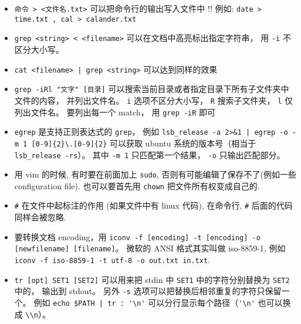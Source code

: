 \begin{itemize}
\item \verb`命令 > <文件名.txt>` 可以把命令行的输出写入文件中 !! 例如: \verb`date > time.txt , cal > calander.txt`
\item \verb`grep <string> < <filename>` 可以在文档中高亮标出指定字符串， 用 \verb|-i| 不区分大小写。
\item \verb`cat <filename> | grep <string>` 可以达到同样的效果
\item \verb`grep -iRl "文字" [目录]` 可以搜索当前目录或者指定目录下所有子文件夹中文件的内容， 并列出文件名。 \verb`i` 选项不区分大小写， \verb`R` 搜索子文件夹， \verb`l` 仅列出文件名。 要列出每一个 match， 用 \verb`grep -iR` 即可
\item \verb|egrep| 是支持正则表达式的 \verb|grep|， 例如 \verb`lsb_release -a 2>&1 | egrep -o -m 1 [0-9]{2}\.[0-9]{2}` 可以获取 ubuntu 系统的版本号（相当于 \verb|lsb_release -rs|）。 其中 \verb|-m 1| 只匹配第一个结果， \verb|-o| 只输出匹配部分。
\item 用 vim 的时候, 有时要在前面加上 \verb`sudo`, 否则有可能编辑了保存不了(例如一些 configuration file). 也可以要首先用 \verb`chown` 把文件所有权变成自己的.
\item \verb`#` 在文件中起标注的作用 (如果文件中有 linux 代码), 在命令行, \verb`#` 后面的代码同样会被忽略.
\item 要转换文档 encoding，用 \verb|iconv -f [encoding] -t [encoding] -o [newfilename] [filename]|。 微软的 ANSI 格式其实叫做 iso-8859-1, 例如 \verb`iconv -f iso-8859-1 -t utf-8 -o out.txt in.txt`.
\item \verb|tr [opt] SET1 [SET2]| 可以用来把 stdin 中 \verb|SET1| 中的字符分别替换为 \verb|SET2| 中的， 输出到 stdout。 另外 \verb|-s| 选项可以把替换后相邻重复的字符只保留一个。 例如 \verb`echo $PATH | tr : '\n'` 可以分行显示每个路径（\verb|'\n'| 也可以换成 \verb|\\n|）。


\end{itemize}
